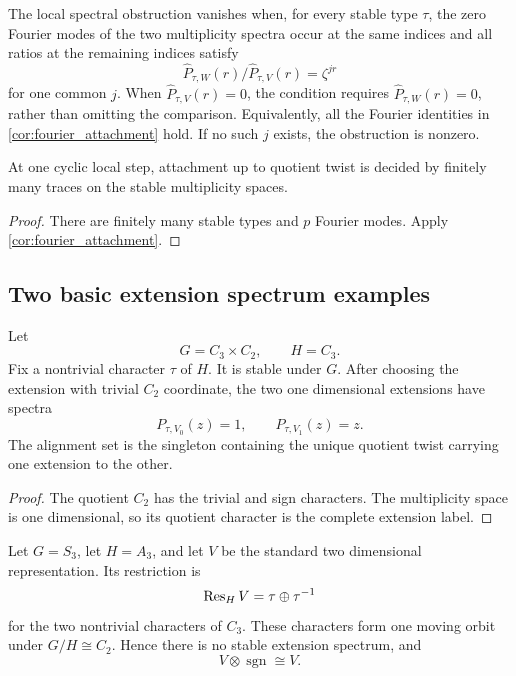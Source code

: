 \begin{definition}\label{def:local_spectral_obstruction}
The local spectral obstruction vanishes when, for every stable type \(\tau\), the zero Fourier modes of the two multiplicity spectra occur at the same indices and all ratios at the remaining indices satisfy
\[
 \widehat P_{\tau,W}(r)/\widehat P_{\tau,V}(r)=\zeta^{jr}
\]
for one common \(j\). When \(\widehat P_{\tau,V}(r)=0\), the condition requires \(\widehat P_{\tau,W}(r)=0\), rather than omitting the comparison. Equivalently, all the Fourier identities in \cref{cor:fourier_attachment} hold. If no such \(j\) exists, the obstruction is nonzero.
\end{definition}

\begin{corollary}\label{cor:finite_local_decision}
At one cyclic local step, attachment up to quotient twist is decided by finitely many traces on the stable multiplicity spaces.
\end{corollary}

\begin{proof}
There are finitely many stable types and \(p\) Fourier modes. Apply \cref{cor:fourier_attachment}.
\end{proof}

\subsection{Two basic extension spectrum examples}

\begin{example}\label{ex:stable_cyclic_type}
Let
\[
 G=C_3\times C_2,
 \qquad
 H=C_3.
\]
Fix a nontrivial character \(\tau\) of \(H\). It is stable under \(G\). After choosing the extension with trivial \(C_2\) coordinate, the two one dimensional extensions have spectra
\[
 P_{\tau,V_0}(z)=1,
 \qquad
 P_{\tau,V_1}(z)=z.
\]
The alignment set is the singleton containing the unique quotient twist carrying one extension to the other.
\end{example}

\begin{proof}
The quotient \(C_2\) has the trivial and sign characters. The multiplicity space is one dimensional, so its quotient character is the complete extension label.
\end{proof}

\begin{example}\label{ex:S3_moving_type}
Let \(G=S_3\), let \(H=A_3\), and let \(V\) be the standard two dimensional representation. Its restriction is
\[
 \operatorname{Res}_HV=\tau\oplus\tau^{-1}
\]
for the two nontrivial characters of \(C_3\). These characters form one moving orbit under \(G/H\cong C_2\). Hence there is no stable extension spectrum, and
\[
 V\otimes\operatorname{sgn}\cong V.
\]
\end{example}

